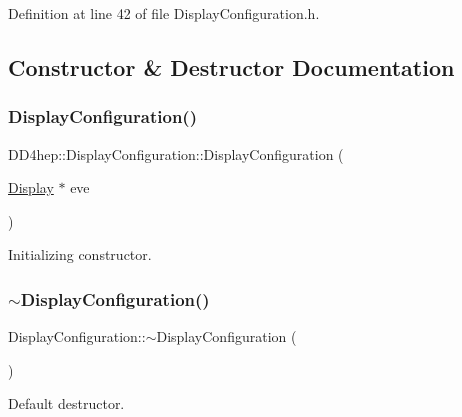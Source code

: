 Definition at line 42 of file Display\+Configuration.\+h.



\subsection{Constructor \& Destructor Documentation}
\hypertarget{class_d_d4hep_1_1_display_configuration_aa27fd31b55d167964c8d5e6d66c8a597}{}\label{class_d_d4hep_1_1_display_configuration_aa27fd31b55d167964c8d5e6d66c8a597} 
\subsubsection{\texorpdfstring{Display\+Configuration()}{DisplayConfiguration()}}
{\footnotesize\ttfamily D\+D4hep\+::\+Display\+Configuration\+::\+Display\+Configuration (\begin{DoxyParamCaption}\item[{\hyperlink{class_d_d4hep_1_1_display}{Display} $\ast$}]{eve }\end{DoxyParamCaption})}



Initializing constructor. 

\hypertarget{class_d_d4hep_1_1_display_configuration_a2271117a8a383c48f4f90728974e2b6d}{}\label{class_d_d4hep_1_1_display_configuration_a2271117a8a383c48f4f90728974e2b6d} 
\subsubsection{\texorpdfstring{$\sim$\+Display\+Configuration()}{~DisplayConfiguration()}}
{\footnotesize\ttfamily Display\+Configuration\+::$\sim$\+Display\+Configuration (\begin{DoxyParamCaption}{ }\end{DoxyParamCaption})\hspace{0.3cm}{\ttfamily [virtual]}}



Default destructor. 



